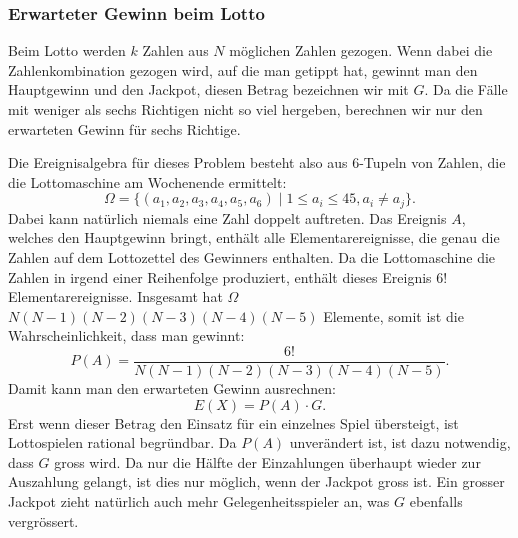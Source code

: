 \subsubsection{Erwarteter Gewinn beim Lotto}
Beim Lotto werden $k$ Zahlen aus $N$ möglichen Zahlen gezogen.
Wenn dabei die Zahlenkombination gezogen wird, auf die man getippt
hat, gewinnt man den Hauptgewinn und den Jackpot, diesen Betrag bezeichnen
wir mit $G$.
Da die Fälle mit
weniger als sechs Richtigen nicht so viel hergeben, berechnen wir
nur den erwarteten Gewinn für sechs Richtige.

Die Ereignisalgebra für dieses Problem besteht also aus 
6-Tupeln von Zahlen, die die Lottomaschine am Wochenende ermittelt:
\[
\Omega=\{(a_1, a_2, a_3, a_4, a_5, a_6)\;|\;1\le a_i\le 45, a_i\ne a_j\}.
\]
Dabei kann natürlich niemals eine Zahl doppelt auftreten.
Das Ereignis $A$, welches den Hauptgewinn bringt, enthält alle
Elementarereignisse, die genau die Zahlen auf dem Lottozettel des
Gewinners enthalten.
Da die Lottomaschine die Zahlen in irgend einer
Reihenfolge produziert, enthält dieses Ereignis $6!$ Elementarereignisse.
Insgesamt hat $\Omega$ $N(N-1)(N-2)(N-3)(N-4)(N-5)$ Elemente, somit ist
die Wahrscheinlichkeit, dass man gewinnt:
\[
P(A)=\frac{6!}{N(N-1)(N-2)(N-3)(N-4)(N-5)}.
\]
Damit
kann man den erwarteten Gewinn ausrechnen:
\[
E(X) = P(A)\cdot G.
\]
Erst wenn dieser Betrag den Einsatz für ein einzelnes Spiel übersteigt,
ist Lottospielen rational begründbar.
Da $P(A)$ unverändert ist,
ist dazu notwendig, dass $G$ gross wird.
Da nur die Hälfte der
Einzahlungen überhaupt wieder zur Auszahlung gelangt, ist dies nur
möglich, wenn der Jackpot gross ist.
Ein grosser Jackpot zieht natürlich
auch mehr Gelegenheitsspieler an, was $G$ ebenfalls vergrössert.
